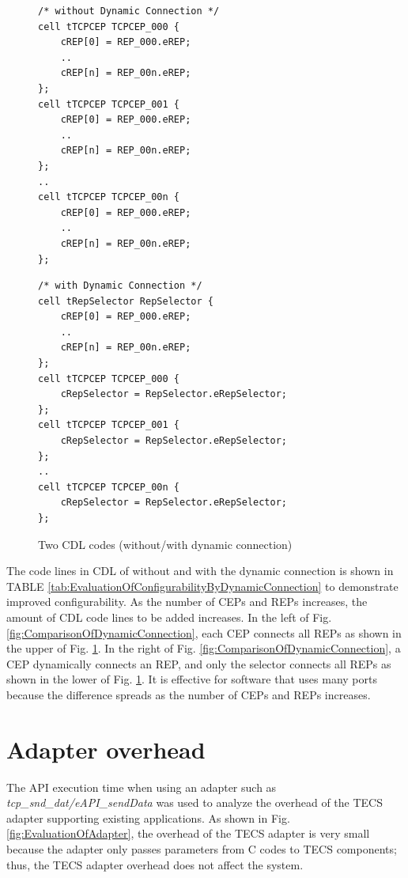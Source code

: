 \documentclass[a4j,12pt,oneside,openany,english]{jsbook}
\begin{document}
\begin{figure}[t]
 \begin{minipage}[t]{0.5\hsize}
  \centering
  \begin{lstlisting}
/* without Dynamic Connection */
cell tTCPCEP TCPCEP_000 {
    cREP[0] = REP_000.eREP;
    ..
    cREP[n] = REP_00n.eREP;
};
cell tTCPCEP TCPCEP_001 {
    cREP[0] = REP_000.eREP;
    ..
    cREP[n] = REP_00n.eREP;
};
..
cell tTCPCEP TCPCEP_00n {
    cREP[0] = REP_000.eREP;
    ..
    cREP[n] = REP_00n.eREP;
};
  \end{lstlisting}
 \end{minipage}
 \begin{minipage}[t]{0.5\hsize}
  \centering
  \begin{lstlisting}
/* with Dynamic Connection */
cell tRepSelector RepSelector {
    cREP[0] = REP_000.eREP;
    ..
    cREP[n] = REP_00n.eREP;
};
cell tTCPCEP TCPCEP_000 {
    cRepSelector = RepSelector.eRepSelector;
};
cell tTCPCEP TCPCEP_001 {
    cRepSelector = RepSelector.eRepSelector;
};
..
cell tTCPCEP TCPCEP_00n {
    cRepSelector = RepSelector.eRepSelector;
};
  \end{lstlisting}
 \end{minipage}
 \caption{Two CDL codes (without/with dynamic connection)}
 \label{src:ComparisonOfCDL}
\end{figure}

The code lines in CDL of without and with the dynamic connection is shown in TABLE \ref{tab:EvaluationOfConfigurabilityByDynamicConnection} to demonstrate improved configurability.
As the number of CEPs and REPs increases, the amount of CDL code lines to be added increases.
In the left of Fig. \ref{fig:ComparisonOfDynamicConnection}, each CEP connects all REPs as shown in the upper of Fig. \ref{src:ComparisonOfCDL}. 
In the right of Fig. \ref{fig:ComparisonOfDynamicConnection}, a CEP dynamically connects an REP, and only the selector connects all REPs as shown in the lower of Fig. \ref{src:ComparisonOfCDL}. 
It is effective for software that uses many ports because the difference spreads as the number of CEPs and REPs increases.


\section{Adapter overhead}

The API execution time when using an adapter such as {\it tcp\_snd\_dat/eAPI\_sendData} was used to analyze the overhead of the TECS adapter supporting existing applications.
As shown in Fig. \ref{fig:EvaluationOfAdapter}, the overhead of the TECS adapter is very small because the adapter only passes parameters from C codes to TECS components; thus, the TECS adapter overhead does not affect the system.
\end{document}
